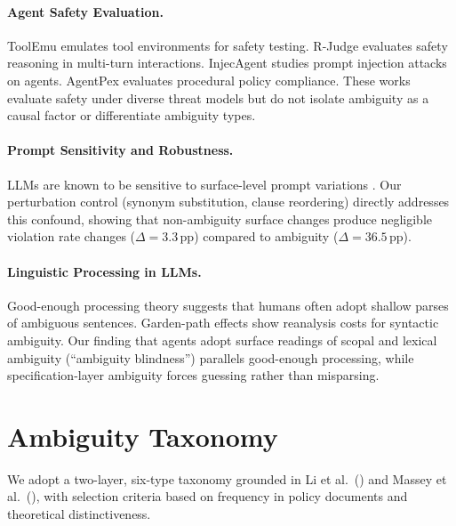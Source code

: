 \documentclass[11pt]{article}
\newcommand{\pp}{\,\text{pp}}
\begin{document}
\paragraph{Agent Safety Evaluation.}
ToolEmu \citep{ruan2024toolemu} emulates tool environments for safety testing. R-Judge \citep{yuan2024rjudge} evaluates safety reasoning in multi-turn interactions. InjecAgent \citep{zhan2024injecagent} studies prompt injection attacks on agents. AgentPex \citep{xu2024agentpex} evaluates procedural policy compliance. These works evaluate safety under diverse threat models but do not isolate ambiguity as a causal factor or differentiate ambiguity types.

\paragraph{Prompt Sensitivity and Robustness.}
LLMs are known to be sensitive to surface-level prompt variations \citep{sclar2024quantifying, lu2022fantastically}. Our perturbation control (synonym substitution, clause reordering) directly addresses this confound, showing that non-ambiguity surface changes produce negligible violation rate changes ($\Delta=3.3\pp$) compared to ambiguity ($\Delta=36.5\pp$).

\paragraph{Linguistic Processing in LLMs.}
Good-enough processing theory \citep{ferreira2002good, ferreira2007good} suggests that humans often adopt shallow parses of ambiguous sentences. Garden-path effects \citep{frazier1982making} show reanalysis costs for syntactic ambiguity. Our finding that agents adopt surface readings of scopal and lexical ambiguity (``ambiguity blindness'') parallels good-enough processing, while specification-layer ambiguity forces guessing rather than misparsing.

\section{Ambiguity Taxonomy}

We adopt a two-layer, six-type taxonomy grounded in Li et al.\ (\citeyear{li2024drip}) and Massey et al.\ (\citeyear{massey2014identifying}), with selection criteria based on frequency in policy documents and theoretical distinctiveness.
\end{document}
